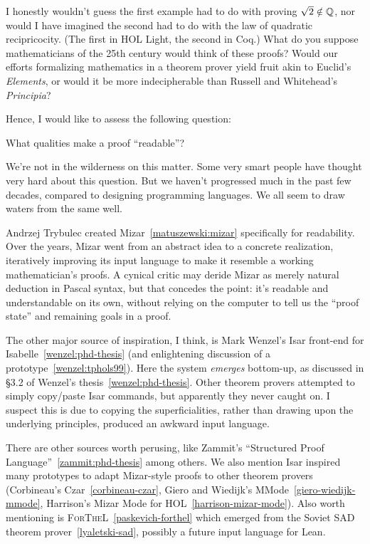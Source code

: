 I honestly wouldn't guess the first example had to do with proving
$\sqrt{2}\notin\mathbb{Q}$, nor would I have imagined the second had to do with
the law of quadratic recipricocity. (The first in HOL Light, the second
in Coq.) What do you suppose mathematicians of the 25th century would
think of these proofs? Would our efforts formalizing mathematics in a
theorem prover yield fruit akin to Euclid's \emph{Elements}, or would it
be more indecipherable than Russell and Whitehead's \emph{Principia}?

Hence, I would like to assess the following question:

\begin{puzzle}
What qualities make a proof ``readable''?
\end{puzzle}

We're not in the wilderness on this matter. Some very smart people have
thought very hard about this question. But we haven't progressed much in
the past few decades, compared to designing programming languages. We
all seem to draw waters from the same well.

Andrzej Trybulec created Mizar~\ref{matuszewski:mizar} specifically for
readability. Over the years, Mizar went from an abstract idea to a
concrete realization, iteratively improving its input language to make
it resemble a working mathematician's proofs. A cynical critic may
deride Mizar as merely natural deduction in Pascal syntax, but that
concedes the point: it's readable and understandable on its own, without
relying on the computer to tell us the ``proof state'' and remaining
goals in a proof.

The other major source of inspiration, I think, is Mark Wenzel's Isar
front-end for Isabelle~\ref{wenzel:phd-thesis} (and enlightening
discussion of a prototype~\ref{wenzel:tphols99}). Here the system
\emph{emerges} bottom-up, as discussed in \S3.2 of Wenzel's
thesis~\ref{wenzel:phd-thesis}. Other theorem provers attempted to
simply copy/paste Isar commands, but apparently they never caught on. I
suspect this is due to copying the superficialities, rather than drawing
upon the underlying principles, produced an awkward input language.

There are other sources worth perusing, like Zammit's ``Structured Proof
Language''~\ref{zammit:phd-thesis} among others. We also mention Isar
inspired many prototypes to adapt Mizar-style proofs to other theorem
provers (Corbineau's Czar~\ref{corbineau-czar}, Giero and Wiedijk's MMode~\ref{giero-wiedijk-mmode},
Harrison's Mizar Mode for HOL~\ref{harrison-mizar-mode}).
Also worth mentioning is \textsc{ForTheL}~\ref{paskevich-forthel} which
emerged from the Soviet SAD theorem prover~\ref{lyaletski-sad}, possibly
a future input language for Lean.

